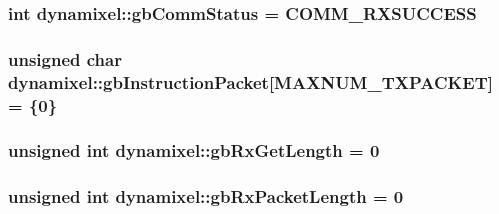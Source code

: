 \subsubsection[{gb\+Comm\+Status}]{\setlength{\rightskip}{0pt plus 5cm}int dynamixel\+::gb\+Comm\+Status = {\bf C\+O\+M\+M\+\_\+\+R\+X\+S\+U\+C\+C\+E\+S\+S}\hspace{0.3cm}{\ttfamily [private]}}\label{classdynamixel_a5b603f6bed7ccc595f1f50bd6a6ebbfc}
\hypertarget{classdynamixel_afd94dcf01b8e96298727776e222de722}{}
\subsubsection[{gb\+Instruction\+Packet}]{\setlength{\rightskip}{0pt plus 5cm}unsigned char dynamixel\+::gb\+Instruction\+Packet\mbox{[}{\bf M\+A\+X\+N\+U\+M\+\_\+\+T\+X\+P\+A\+C\+K\+E\+T}\mbox{]} = \{0\}\hspace{0.3cm}{\ttfamily [private]}}\label{classdynamixel_afd94dcf01b8e96298727776e222de722}
\hypertarget{classdynamixel_a9d590ce24791d111c2db9b66be1e046d}{}
\subsubsection[{gb\+Rx\+Get\+Length}]{\setlength{\rightskip}{0pt plus 5cm}unsigned int dynamixel\+::gb\+Rx\+Get\+Length = 0\hspace{0.3cm}{\ttfamily [private]}}\label{classdynamixel_a9d590ce24791d111c2db9b66be1e046d}
\hypertarget{classdynamixel_a333686e1b5903d16c41df8172b6bd5a8}{}
\subsubsection[{gb\+Rx\+Packet\+Length}]{\setlength{\rightskip}{0pt plus 5cm}unsigned int dynamixel\+::gb\+Rx\+Packet\+Length = 0\hspace{0.3cm}{\ttfamily [private]}}\label{classdynamixel_a333686e1b5903d16c41df8172b6bd5a8}
\hypertarget{classdynamixel_aa57c86d3bbbeaf5c9d4f6bd00376b04f}{}
